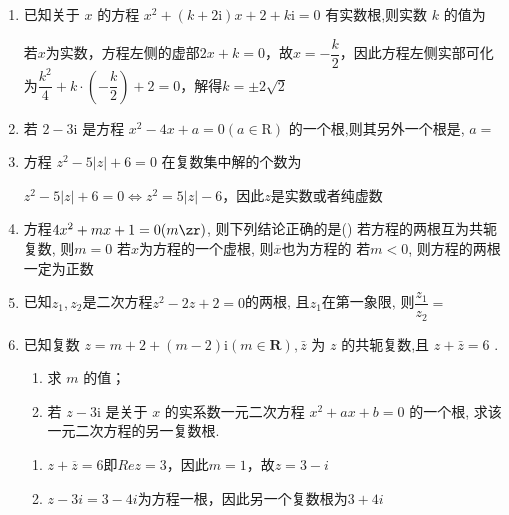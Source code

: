 \begin{enumerate}
    \item 已知关于 $ x $ 的方程 $ {x}^{2} + \left( {k + 2\mathrm{i}}\right) x + 2 + k\mathrm{i} = 0 $ 有实数根,则实数 $ k $ 的值为

    \begin{jieda}
        若$x$为实数，方程左侧的虚部$2x+k = 0$，故$x = -\dfrac{k}{2}$，因此方程左侧实部可化为$\dfrac{k^2}{4}+k\cdot\left(-\dfrac{k}{2}\right)+2 = 0$，解得$k = \pm 2\sqrt{2}$
    \end{jieda}

    \item 若 $ 2 - 3\mathrm{i} $ 是方程 $ {x}^{2} - {4x} + a = 0\left( {a \in  \mathrm{R}}\right) $ 的一个根,则其另外一个根是, $a = $ 

    \item 方程 $ {z}^{2} - 5\left| z\right|  + 6 = 0 $ 在复数集中解的个数为
    \begin{jieda}
        ${z}^{2} - 5\left| z\right|  + 6 = 0 \Longleftrightarrow z^2 = 5|z| - 6$，因此$z$是实数或者纯虚数
    \end{jieda}

    \item 方程$4x^2+mx+1=0(m\zr)$, 则下列结论正确的是\dotfill()
    {若方程的两根互为共轭复数, 则$m=0$}
    {若$x$为方程的一个虚根, 则$\overline{x}$也为方程的} 
    {若$m<0$, 则方程的两根一定为正数}

    \item 已知$z_1,z_2$是二次方程$z^2-2z+2=0$的两根, 且$z_1$在第一象限, 则$\dfrac{z_1}{z_2}=$\blkda{$\mi$}

    \item 已知复数 $ z = m + 2 + \left( {m - 2}\right) \mathrm{i}\left( {m \in  \mathbf{R}}\right) ,\bar{z} $ 为 $ z $ 的共轭复数,且 $ z + \bar{z} = 6 $ .
    \begin{enumerate}
        \item 求 $ m $ 的值；
        \item 若 $ z - 3\mathrm{i} $ 是关于 $ x $ 的实系数一元二次方程 $ {x}^{2} + {ax} + b = 0 $ 的一个根, 求该一元二次方程的另一复数根.
    \end{enumerate}
    \begin{jieda}
        \begin{enumerate}
            \item $z + \overline{z} = 6$即$Rez = 3$，因此$m = 1$，故$z = 3 - i$
            \item $z - 3i = 3 - 4i$为方程一根，因此另一个复数根为$3+4i$
        \end{enumerate}
    \end{jieda}


\end{enumerate}
